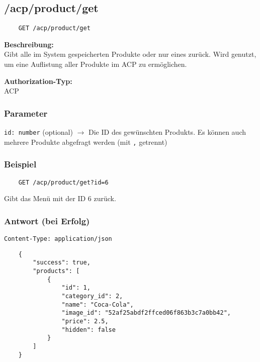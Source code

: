 \subsection{/acp/product/get}

\begin{lstlisting}
    GET /acp/product/get
\end{lstlisting}

\textbf{Beschreibung:} \\
Gibt alle im System gespeicherten Produkte oder nur eines zurück. Wird genutzt, um eine Auflistung aller Produkte im ACP zu ermöglichen.

\textbf{Authorization-Typ:} \\
ACP

\subsubsection{Parameter}

\lstinline{id: number} (optional)
$\rightarrow$ Die ID des gewünschten Produkts. Es können auch mehrere Produkte abgefragt werden (mit \lstinline{,} getrennt)

\subsubsection{Beispiel}

\begin{lstlisting}
    GET /acp/product/get?id=6
\end{lstlisting}

Gibt das Menü mit der ID 6 zurück.

\subsubsection{Antwort (bei Erfolg)}

\lstinline{Content-Type: application/json}
\begin{lstlisting}
    {
        "success": true, 
        "products": [
            {
                "id": 1,
                "category_id": 2,
                "name": "Coca-Cola",
                "image_id": "52af25abdf2ffced06f863b3c7a0bb42",
                "price": 2.5,
                "hidden": false
            }
        ]
    }
\end{lstlisting}
